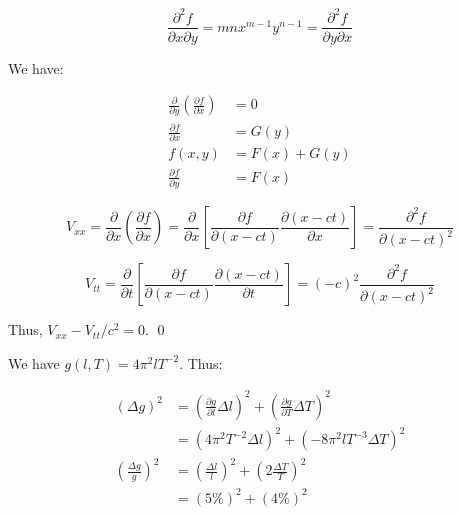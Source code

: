 \documentclass[12pt]{article}
\begin{document}

\begin{equation}
    \frac{\partial^{2} f}{\partial x \partial y} = mn x^{m - 1} y^{n - 1} = \frac{\partial^{2} f}{\partial y \partial x}
\end{equation}

We have:

\begin{equation}
    \begin{split}
        \frac{\partial}{\partial y} \left( \frac{\partial f}{\partial x} \right) &= 0 \\
        \frac{\partial f}{\partial x} &= G(y) \\
        f(x, y) &= F(x) + G(y) \\
        \frac{\partial f}{\partial y} &= F(x)
    \end{split}
\end{equation}


\begin{equation}
    V_{xx} = \frac{\partial}{\partial x} \left( \frac{\partial f}{\partial x} \right) = \frac{\partial}{\partial x} \left[ \frac{\partial f}{\partial (x - ct)} \frac{\partial (x - ct)}{\partial x} \right] = \frac{\partial^{2} f}{\partial (x - ct)^{2}}
\end{equation}

\begin{equation}
    V_{tt} = \frac{\partial}{\partial t} \left[ \frac{\partial f}{\partial (x - ct)} \frac{\partial (x - ct)}{\partial t} \right] = (-c)^{2} \frac{\partial^{2} f}{\partial (x - ct)^{2}}
\end{equation}

Thus, $V_{xx} - V_{tt}/c^{2} = 0$.
\qed


We have $g(l, T) = 4\pi^{2} l T^{-2}$. Thus:

\begin{equation}
    \begin{split}
        (\Delta g)^{2} &= (\frac{\partial g}{\partial l} \Delta l)^{2} + (\frac{\partial g}{\partial T} \Delta T)^{2} \\
        &= (4\pi^{2} T^{-2} \Delta l)^{2} + (-8\pi^{2} l T^{-3} \Delta T)^{2} \\
        \left( \frac{\Delta g}{g} \right)^{2} &= \left( \frac{\Delta l}{l} \right)^{2} + \left( 2\frac{\Delta T}{T} \right)^{2} \\
        &= (5\%)^{2} + (4\%)^{2} \\
    \end{split}
\end{equation}
\end{document}
